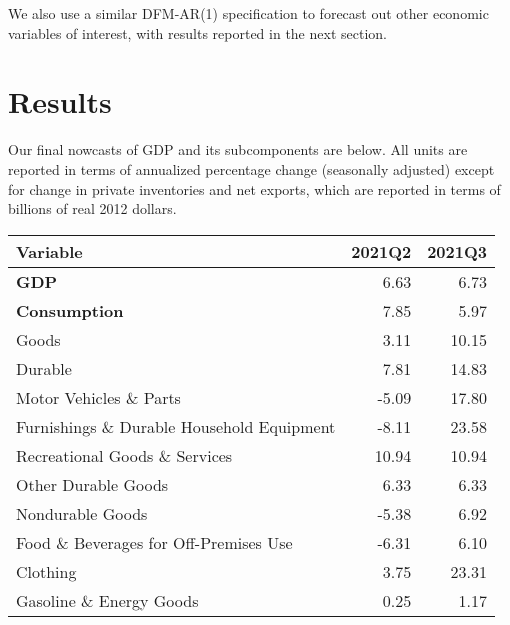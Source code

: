 \documentclass[11pt, letterpaper]{article}\usepackage[]{graphicx}\usepackage[]{color}
\begin{document}
We also use a similar DFM-AR(1) specification to forecast out other economic variables of interest, with results reported in the next section.


\section{Results}
Our final nowcasts of GDP and its subcomponents are below. All units are reported in terms of annualized percentage change (seasonally adjusted) except for change in private inventories and net exports, which are reported in terms of billions of real 2012 dollars.
\begin{table}[H]
\centering
\begingroup\fontsize{10pt}{12pt}\selectfont
\begin{tabular}{lrr}
  \hline
Variable & 2021Q2 & 2021Q3 \\ 
  \hline
\hspace{0mm} \textbf{GDP} & 6.63 & 6.73 \\ 
  \hspace{0mm} \textbf{Consumption} & 7.85 & 5.97 \\ 
  \hspace{8mm}  Goods & 3.11 & 10.15 \\ 
  \hspace{16mm}  Durable & 7.81 & 14.83 \\ 
  \hspace{24mm}  Motor Vehicles \& Parts & -5.09 & 17.80 \\ 
  \hspace{24mm}  Furnishings \& Durable Household Equipment & -8.11 & 23.58 \\ 
  \hspace{24mm}  Recreational Goods \& Services & 10.94 & 10.94 \\ 
  \hspace{24mm}  Other Durable Goods & 6.33 & 6.33 \\ 
  \hspace{16mm}  Nondurable Goods & -5.38 & 6.92 \\ 
  \hspace{24mm}  Food \& Beverages for Off-Premises Use & -6.31 & 6.10 \\ 
  \hspace{24mm}  Clothing & 3.75 & 23.31 \\ 
  \hspace{24mm}  Gasoline \& Energy Goods & 0.25 & 1.17 \\ 

\end{tabular}
\end{table}
\end{document}
